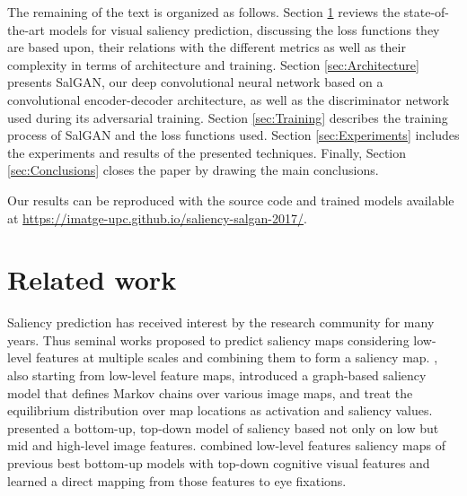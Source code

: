 \documentclass[times,twocolumn,final,authoryear]{elsarticle}
\begin{document}
The remaining of the text is organized as follows. 
Section \ref{sec:RelatedWork} reviews the state-of-the-art models for visual saliency prediction, discussing the loss functions they are based upon, their relations with the different metrics as well as their complexity in terms of architecture and training. 
Section \ref{sec:Architecture} presents SalGAN, our deep convolutional neural network based on a convolutional encoder-decoder architecture, as well as the discriminator network used during its adversarial training.
Section \ref{sec:Training} describes the training process of SalGAN and the loss functions used.
Section \ref{sec:Experiments} includes the experiments and results of the presented techniques. Finally, Section \ref{sec:Conclusions} closes the paper by drawing the main conclusions.

Our results can be reproduced with the source code
and trained models available at \url{https://imatge-upc.github.io/saliency-salgan-2017/}.


\section{Related work}
\label{sec:RelatedWork}

Saliency prediction has received interest by the research community for many years. Thus seminal works \citep{Itti1998PAMI} proposed to predict saliency maps considering low-level features at multiple scales and combining them to form a saliency map. \citep{harel2006nips}, also starting from low-level feature maps, introduced a graph-based saliency model that defines Markov chains over various image maps, and treat the equilibrium distribution over map locations as activation and saliency values. \citep{judd2009iccv} presented a bottom-up, top-down model of saliency based not only on low but mid and high-level image features. \citep{borji2012cvpr} combined low-level features saliency maps of previous best bottom-up models with top-down cognitive visual features and learned a direct mapping from those features to eye fixations.
\end{document}

